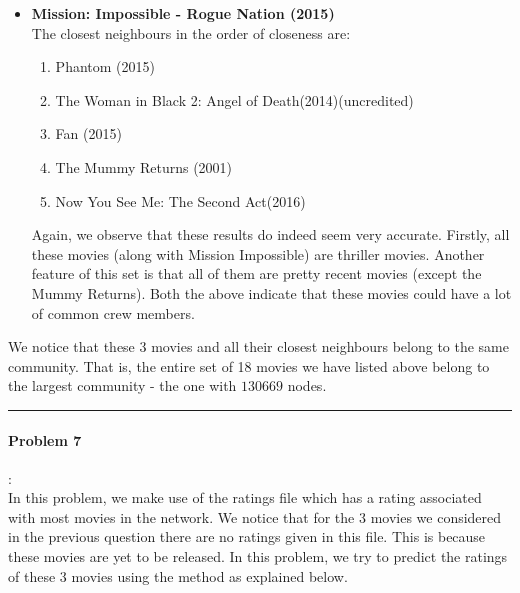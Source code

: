 \documentclass{article}
\begin{document}
\begin{itemize}
\item \textbf{Mission: Impossible - Rogue Nation (2015)}\\
 The closest neighbours in the order of closeness are:
 \begin{enumerate}
  \item
  Phantom (2015)               
  \item
  The Woman in Black 2: Angel of Death(2014)(uncredited)
  \item
  Fan (2015) 
  \item
  The Mummy Returns (2001)
  \item
  Now You See Me: The Second Act(2016) 
   
 \end{enumerate}
Again, we observe that these results do indeed seem very accurate. 
Firstly, all these movies (along with Mission Impossible) are thriller movies.
Another feature of this set is that all of them are pretty recent movies (except the Mummy Returns).
Both the above indicate that these movies could have a lot of common crew members.



\end{itemize}

We notice that these 3 movies and all their closest neighbours belong to the same community. That is, the entire set of 
18 movies we have listed above belong to the largest community - the one with $130669$ nodes.\\

\hrule

\paragraph{Problem 7}:\\
In this problem, we make use of the ratings file which has a rating associated with most movies in the network.
We notice that for the 3 movies we considered in the previous question there are no ratings given in this file.
This is because these movies are yet to be released. In this problem, we try to predict the ratings of these 3 movies using the method as explained below.\\
\end{document}
